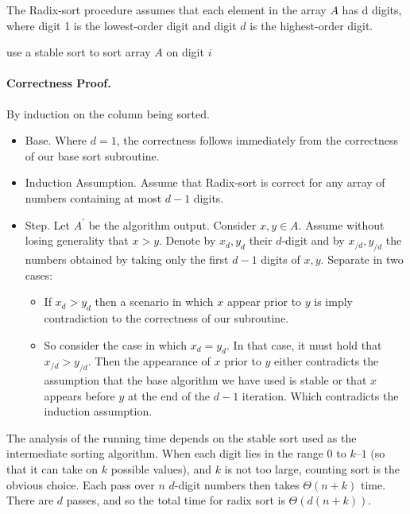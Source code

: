 The Radix-sort procedure assumes that each element in the array $A$ has d digits, where digit 1 is the lowest-order digit and digit $d$ is the highest-order digit.


  \begin{algorithm}
     {
        use a stable sort to sort array $A$ on digit $i$
    }
\caption{radix-sort($A$, $n$, $d$)}
  \end{algorithm}

\paragraph{Correctness Proof.} By induction on the column being sorted.
\begin{itemize}
  \item Base. Where $d = 1$, the correctness follows immediately from the correctness of our base sort subroutine. 
  \item Induction Assumption. Assume that Radix-sort is correct for any array of numbers containing at most $d-1$ digits. 
  \item Step. Let $A^{\prime}$  be the algorithm output. Consider $x,y \in A$. Assume without losing generality that $x > y$. Denote by $x_{d}, y_{d}$ their $d$-digit and by $x_{/d}, y_{/d}$ the numbers obtained by taking only the first  $d-1$ digits of $x,y$. Separate in two cases:

    \begin{itemize}
      \item   If $x_{d} > y_{d}$ then a scenario in which $x$ appear prior to $y$ is  imply contradiction to the correctness of our subroutine.
      \item   So consider the case in which $x_{d} = y_{d}$. In that case, it must hold that $x_{/d} > y_{/d}$. Then the appearance of $x$ prior to $y$ either contradicts the assumption that the base algorithm we have used is stable or that $x$ appears before $y$ at the end of the $d-1$ iteration. Which contradicts the induction assumption. 
    \end{itemize}
 \end{itemize}

The analysis of the running time depends on the stable sort used as the intermediate sorting algorithm. When each digit lies in the range $0$ to $k – 1$ (so that it can take on $k$ possible values), and $k$ is not too large, counting sort is the obvious choice. Each pass over $n$ $d$-digit numbers then takes $\Theta(n + k)$ time. There are $d$ passes, and so the total time for radix sort is $\Theta\left(d(n + k)\right)$.

